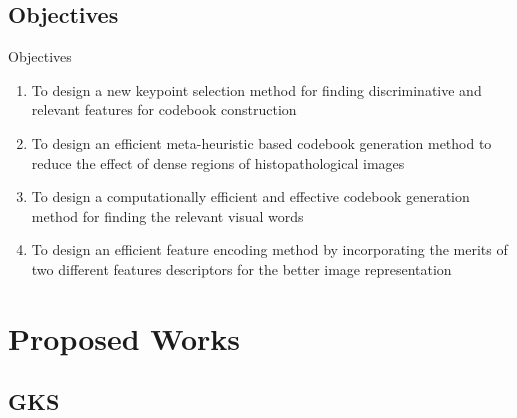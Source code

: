 \documentclass [9pt,times] {beamer}
\begin{document}
\subsection{Objectives}
\begin{frame}{Objectives}
\begin{enumerate}
	\justifying
	\item To design a new keypoint selection method for finding discriminative and relevant features for codebook construction \\[3ex]

	\item To design an efficient meta-heuristic based codebook generation method to reduce the effect of dense regions of histopathological images \\[3ex]
	
	\item To design a computationally efficient and effective codebook generation method for finding the relevant visual words \\[3ex]

	\item To design an efficient feature encoding method by incorporating the merits of two different features descriptors for the better image representation
	
\end{enumerate}
\end{frame}




\section{Proposed Works}

\subsection{GKS}
\end{document}
